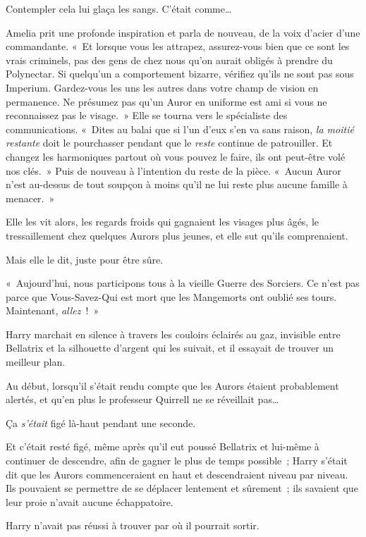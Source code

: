 Contempler cela lui glaça les sangs.
C'était comme…

Amelia prit une profonde inspiration et parla de nouveau, de la voix d'acier d'une commandante.
«~Et lorsque vous les attrapez, assurez-vous bien que ce sont les vrais criminels, pas des gens de chez nous qu'on aurait obligés à prendre du Polynectar.
Si quelqu'un a comportement bizarre, vérifiez qu'ils ne sont pas sous Imperium.
Gardez-vous les uns les autres dans votre champ de vision en permanence.
Ne présumez pas qu'un Auror en uniforme est ami si vous ne reconnaissez pas le visage.~»
Elle se tourna vers le spécialiste des communications.
«~Dites au balai que si l'un d'eux s'en va sans raison, \emph{la moitié restante} doit le pourchasser pendant que le \emph{reste} continue de patrouiller.
Et changez les harmoniques partout où vous pouvez le faire, ils ont peut-être volé nos clés.~»
Puis de nouveau à l'intention du reste de la pièce.
«~Aucun Auror n'est au-dessus de tout soupçon à moins qu'il ne lui reste plus aucune famille à menacer.~»

Elle les vit alors, les regards froids qui gagnaient les visages plus âgés, le tressaillement chez quelques Aurors plus jeunes, et elle sut qu'ils comprenaient.

Mais elle le dit, juste pour être sûre.

«~Aujourd'hui, nous participons tous à la vieille Guerre des Sorciers.
Ce n'est pas parce que Vous-Savez-Qui est mort que les Mangemorts ont oublié ses tours.
Maintenant, \emph{allez}~!~»

\later

Harry marchait en silence à travers les couloirs éclairés au gaz, invisible entre Bellatrix et la silhouette d'argent qui les suivait, et il essayait de trouver un meilleur plan.

Au début, lorsqu'il s'était rendu compte que les Aurors étaient probablement alertés, et qu'en plus le professeur Quirrell ne se réveillait pas…

Ça \emph{s'était} figé là-haut pendant une seconde.

Et c'était resté figé, même après qu'il eut poussé Bellatrix et lui-même à continuer de descendre, afin de gagner le plus de temps possible~; Harry s'était dit que les Aurors commenceraient en haut et descendraient niveau par niveau.
Ils pouvaient se permettre de se déplacer lentement et sûrement~; ils savaient que leur proie n'avait aucune échappatoire.

Harry n'avait pas réussi à trouver par où il pourrait sortir.

